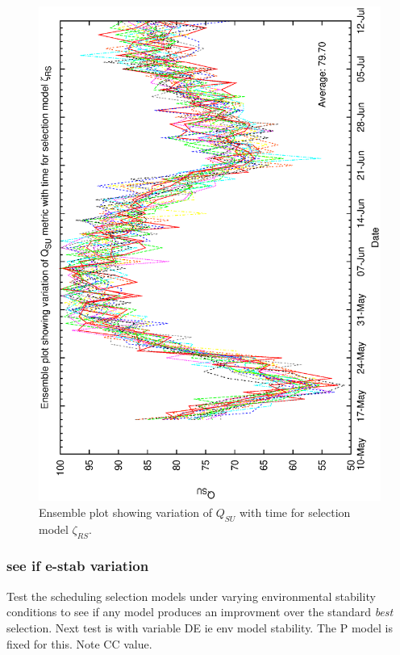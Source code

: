 \begin{figure}[h]

\begin{center}
 \includegraphics[scale=0.5, angle=-90]{figures/biasrs_ensemble.eps}
 \caption[Ensemble plot showing variation of $Q_{SU}$ with time for selection model $\zeta_{RS}$.] 
   {Ensemble plot showing variation of $Q_{SU}$ with time for selection model $\zeta_{RS}$.}
\label{fig:ensemble_relscorebias}
\end{center} 
\end{figure}



\subsubsection{see if e-stab variation}
Test the scheduling selection models under varying environmental stability conditions to see if any model produces an improvment over the standard \emph{best} selection.
Next test is with variable DE ie env model stability. The P model is fixed for this. Note CC value. 


